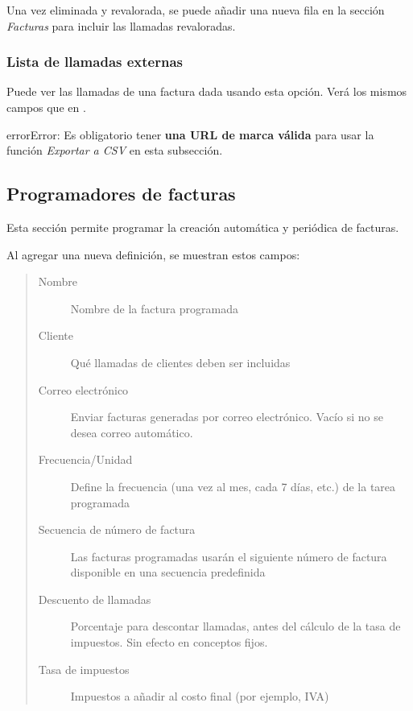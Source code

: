 \documentclass[letterpaper,10pt,spanish]{sphinxmanual}
\begin{document}
Una vez eliminada y revalorada, se puede añadir una nueva fila en la sección \emph{Facturas} para incluir las llamadas revaloradas.


\subsubsection{Lista de llamadas externas}
\label{administration_portal/brand/invoicing/invoices:list-of-external-calls}
Puede ver las llamadas de una factura dada usando esta opción. Verá los mismos campos que en {\hyperref[administration_portal/platform/external_calls:external\string-calls]{}}.

\begin{notice}{error}{Error:}
Es obligatorio tener \textbf{una URL de marca válida} para usar la función \emph{Exportar a CSV} en esta subsección.
\end{notice}


\subsection{Programadores de facturas}
\label{administration_portal/brand/invoicing/invoice_schedulers::doc}\label{administration_portal/brand/invoicing/invoice_schedulers:invoice-schedulers}\label{administration_portal/brand/invoicing/invoice_schedulers:id1}
Esta sección permite programar la creación automática y periódica de facturas.

Al agregar una nueva definición, se muestran estos campos:
\begin{quote}
\begin{description}
\item[{Nombre}] \leavevmode
Nombre de la factura programada

\item[{Cliente}] \leavevmode
Qué llamadas de clientes deben ser incluidas

\item[{Correo electrónico}] \leavevmode
Enviar facturas generadas por correo electrónico. Vacío si no se desea correo automático.

\item[{Frecuencia/Unidad}] \leavevmode
Define la frecuencia (una vez al mes, cada 7 días, etc.) de la tarea programada

\item[{Secuencia de número de factura}] \leavevmode
Las facturas programadas usarán el siguiente número de factura disponible en una secuencia predefinida

\item[{Descuento de llamadas}] \leavevmode
Porcentaje para descontar llamadas, antes del cálculo de la tasa de impuestos. Sin efecto en conceptos fijos.

\item[{Tasa de impuestos}] \leavevmode
Impuestos a añadir al costo final (por ejemplo, IVA)

\end{description}
\end{quote}
\end{document}
